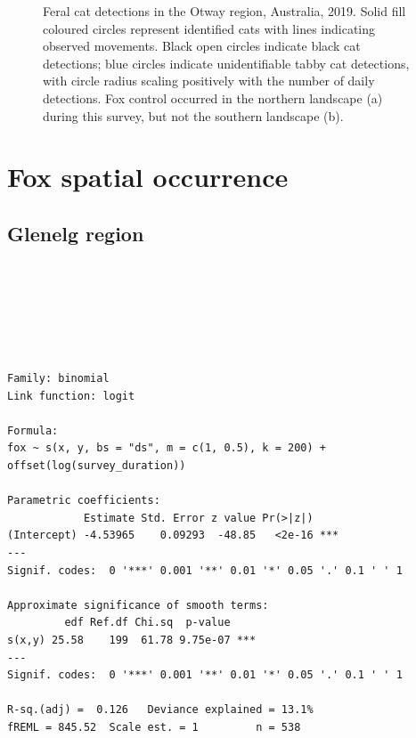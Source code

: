 \documentclass[11pt,a4paper,titlepage,twoside,openright]{style/unimelbthesis}
\begin{document}
\begin{mainmatter}
\begin{figure}
{}

\caption{Feral cat detections in the Otway region, Australia, 2019. Solid fill coloured circles represent identified cats with lines indicating observed movements. Black open circles indicate black cat detections; blue circles indicate unidentifiable tabby cat detections, with circle radius scaling positively with the number of daily detections. Fox control occurred in the northern landscape (a) during this survey, but not the southern landscape (b).}\label{fig:density-plot-ch-6}
\end{figure}
\newpage

\hypertarget{density-app-fox}{%
\section{Fox spatial occurrence}\label{density-app-fox}}

\hypertarget{glenelg-region-1}{%
\subsection{Glenelg region}\label{glenelg-region-1}}

\(~\)

\(~\)

\(~\)
\begin{verbatim}

Family: binomial 
Link function: logit 

Formula:
fox ~ s(x, y, bs = "ds", m = c(1, 0.5), k = 200) + offset(log(survey_duration))

Parametric coefficients:
            Estimate Std. Error z value Pr(>|z|)    
(Intercept) -4.53965    0.09293  -48.85   <2e-16 ***
---
Signif. codes:  0 '***' 0.001 '**' 0.01 '*' 0.05 '.' 0.1 ' ' 1

Approximate significance of smooth terms:
         edf Ref.df Chi.sq  p-value    
s(x,y) 25.58    199  61.78 9.75e-07 ***
---
Signif. codes:  0 '***' 0.001 '**' 0.01 '*' 0.05 '.' 0.1 ' ' 1

R-sq.(adj) =  0.126   Deviance explained = 13.1%
fREML = 845.52  Scale est. = 1         n = 538
\end{verbatim}
\newpage

\(~\)

\(~\)

\(~\)
\begin{figure}


\end{figure}
\end{mainmatter}
\end{document}
